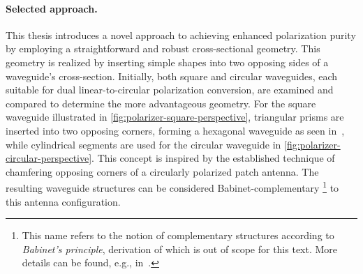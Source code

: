 \documentclass[11pt,a4paper,twoside,openany]{report}
\begin{document}
\paragraph{Selected approach.} This thesis introduces a novel approach to achieving enhanced polarization purity by employing a straightforward and robust cross-sectional geometry. This geometry is realized by inserting simple shapes into two opposing sides of a waveguide's cross-section. Initially, both square and circular waveguides, each suitable for dual linear-to-circular polarization conversion, are examined and compared to determine the more advantageous geometry. For the square waveguide illustrated in \cref{fig:polarizer-square-perspective}, triangular prisms are inserted into two opposing corners, forming a hexagonal waveguide as seen in~\parencite{bhardwaj-volakis:hexagonal-waveguides-new-class-of-waveguides-for-mmwave-circularly-polarized-horns}, while cylindrical segments are used for the circular waveguide in \cref{fig:polarizer-circular-perspective}. This concept is inspired by the established technique of chamfering opposing corners of a circularly polarized patch antenna. The resulting waveguide structures can be considered Babinet-complementary%
    \footnote{This name refers to the notion of complementary structures according to \emph{Babinet's principle}, derivation of which is out of scope for this text. More details can be found, e.g., in~\parencite{born-wolf:principles-of-optics}.}
to this antenna configuration.
\end{document}
